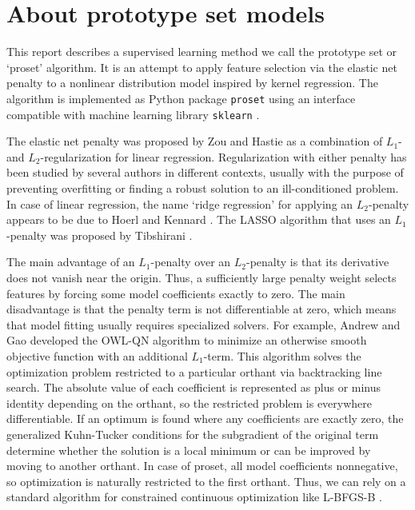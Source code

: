 \chapter{About prototype set models}
\label{ch_about}
%
This report describes a supervised learning method we call the prototype set or `proset' algorithm.
It is an attempt to apply feature selection via the elastic net penalty to a nonlinear distribution model inspired by kernel regression.
The algorithm is implemented as Python package \texttt{proset} using an interface compatible with machine learning library \texttt{sklearn} \cite{Pedregosa_11}.\par
%
The elastic net penalty was proposed by Zou and Hastie \cite{Zou_05} as a combination of $L_1$- and $L_2$-regularization for linear regression.
Regularization with either penalty has been studied by several authors in different contexts, usually with the purpose of preventing overfitting or finding a robust solution to an ill-conditioned problem.
In case of linear regression, the name `ridge regression' for applying an $L_2$-penalty appears to be due to Hoerl and Kennard \cite{Hoerl_70}.
The LASSO algorithm that uses an $L_1$-penalty was proposed by Tibshirani \cite{Tibshirani_96}.\par
%
The main advantage of an $L_1$-penalty over an $L_2$-penalty is that its derivative does not vanish near the origin.
Thus, a sufficiently large penalty weight selects features by forcing some model coefficients exactly to zero.
The main disadvantage is that the penalty term is not differentiable at zero, which means that model fitting usually requires specialized solvers.
For example, Andrew and Gao \cite{Andrew_07} developed the OWL-QN algorithm to minimize an otherwise smooth objective function with an additional $L_1$-term.
This algorithm solves the optimization problem restricted to a particular orthant via backtracking line search.
The absolute value of each coefficient is represented as plus or minus identity depending on the orthant, so the restricted problem is everywhere differentiable.
If an optimum is found where any coefficients are exactly zero, the generalized Kuhn-Tucker conditions for the subgradient of the original term determine whether the solution is a local minimum or can be improved by moving to another orthant.
In case of proset, all model coefficients nonnegative, so optimization is naturally restricted to the first orthant.
Thus, we can rely on a standard algorithm for constrained continuous optimization like L-BFGS-B \cite{Byrd_95}.\par
